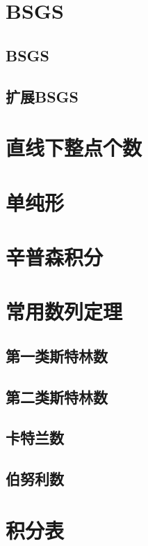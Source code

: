 \section{BSGS}
\subsection{BSGS}
\subsection{扩展BSGS}
\section{直线下整点个数}
\section{单纯形}
\section{辛普森积分}
\section{常用数列定理}
\subsection{第一类斯特林数}
\subsection{第二类斯特林数}
\subsection{卡特兰数}
\subsection{伯努利数}
\section{积分表}